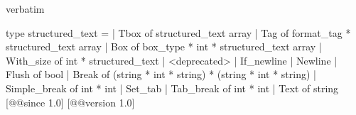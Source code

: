 \begin{camlexample}{verbatim}
\begin{caml}
\begin{camlinput}
type structured_text =
  | Tbox of structured_text array
  | Tag of format_tag * structured_text array
  | Box of box_type * int * structured_text array
  | With_size of int * structured_text
  | <deprecated>
  | If_newline
  | Newline
  | Flush of bool
  | Break of (string * int * string) * (string * int * string)
  | Simple_break of int * int
  | Set_tab
  | Tab_break of int * int
  | Text of string
[@@since 1.0] [@@version 1.0]
\end{camlinput}
\end{caml}
\end{camlexample}
